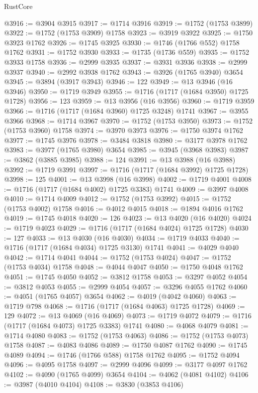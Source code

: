 \begin{lexlean}{RustCore}
\begin{coremodule}
@3916 := @3904 @3915
@3917 := @1714 @3916
@3919 := @1752 (@1753 @3899)
@3922 := @1752 (@1753 @3909) @1758
@3923 := @3919 @3922
@3925 := @1750 @3923 @1762
@3926 := @1745 @3925
@3930 := @1746 (@1766 @552) @1758 @1762
@3931 := @1752 @3930
@3933 := @1735 (@1736 @559)
@3935 := @1752 @3933 @1758
@3936 := @2999 @3935
@3937 := @3931 @3936
@3938 := @2999 @3937
@3940 := @2992 @3938 @1762
@3943 := @3926 (@1765 @3940) @3654
@3945 := @3894 (@3917 @3943)
@3946 := 122
@3949 := @13 @3946 (@16 @3946)
@3950 := @1719 @3949
@3955 := @1716 (@1717 (@1684 @3950) @1725 @1728)
@3956 := 123
@3959 := @13 @3956 (@16 @3956)
@3960 := @1719 @3959
@3966 := @1716 (@1717 (@1684 @3960) @1725 @3248) @1741
@3967 := @3955 @3966
@3968 := @1714 @3967
@3970 := @1752 (@1753 @3950)
@3973 := @1752 (@1753 @3960) @1758
@3974 := @3970 @3973
@3976 := @1750 @3974 @1762
@3977 := @1745 @3976
@3978 := @3484 @3818
@3980 := @3177 @3978 @1762
@3983 := @3977 (@1765 @3980) @3654
@3985 := @3945 (@3968 @3983)
@3987 := @3862 (@3885 @3985)
@3988 := 124
@3991 := @13 @3988 (@16 @3988)
@3992 := @1719 @3991
@3997 := @1716 (@1717 (@1684 @3992) @1725 @1728)
@3998 := 125
@4001 := @13 @3998 (@16 @3998)
@4002 := @1719 @4001
@4008 := @1716 (@1717 (@1684 @4002) @1725 @3383) @1741
@4009 := @3997 @4008
@4010 := @1714 @4009
@4012 := @1752 (@1753 @3992)
@4015 := @1752 (@1753 @4002) @1758
@4016 := @4012 @4015
@4018 := @1894 @4016 @1762
@4019 := @1745 @4018
@4020 := 126
@4023 := @13 @4020 (@16 @4020)
@4024 := @1719 @4023
@4029 := @1716 (@1717 (@1684 @4024) @1725 @1728)
@4030 := 127
@4033 := @13 @4030 (@16 @4030)
@4034 := @1719 @4033
@4040 := @1716 (@1717 (@1684 @4034) @1725 @3130) @1741
@4041 := @4029 @4040
@4042 := @1714 @4041
@4044 := @1752 (@1753 @4024)
@4047 := @1752 (@1753 @4034) @1758
@4048 := @4044 @4047
@4050 := @1750 @4048 @1762
@4051 := @1745 @4050
@4052 := @3812 @1758
@4053 := @3297 @4052
@4054 := @3812 @4053
@4055 := @2999 @4054
@4057 := @3296 @4055 @1762
@4060 := @4051 (@1765 @4057) @3654
@4062 := @4019 (@4042 @4060)
@4063 := @1719 @798
@4068 := @1716 (@1717 (@1684 @4063) @1725 @1728)
@4069 := 129
@4072 := @13 @4069 (@16 @4069)
@4073 := @1719 @4072
@4079 := @1716 (@1717 (@1684 @4073) @1725 @3383) @1741
@4080 := @4068 @4079
@4081 := @1714 @4080
@4083 := @1752 (@1753 @4063)
@4086 := @1752 (@1753 @4073) @1758
@4087 := @4083 @4086
@4089 := @1750 @4087 @1762
@4090 := @1745 @4089
@4094 := @1746 (@1766 @588) @1758 @1762
@4095 := @1752 @4094
@4096 := @4095 @1758
@4097 := @2999 @4096
@4099 := @3177 @4097 @1762
@4102 := @4090 (@1765 @4099) @3654
@4104 := @4062 (@4081 @4102)
@4106 := @3987 (@4010 @4104)
@4108 := @3830 (@3853 @4106)

\end{coremodule}
\end{lexlean}
